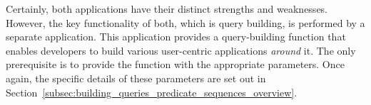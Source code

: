 Certainly, both applications have their distinct strengths and weaknesses. However, the key functionality of both, which is query building, is performed by a separate application. This application provides a query-building function that enables developers to build various user-centric applications \textit{around} it. The only prerequisite is to provide the function with the appropriate parameters. Once again, the specific details of these parameters are set out in Section~\ref{subsec:building_queries_predicate_sequences_overview}.